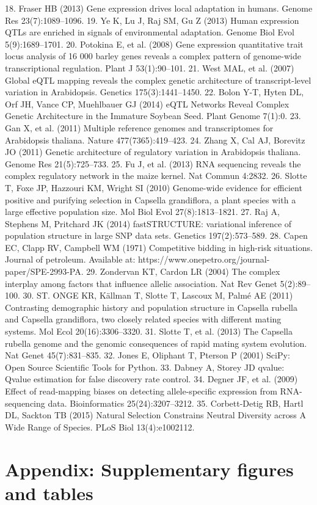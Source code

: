 18. 	Fraser HB (2013) Gene expression drives local adaptation in humans. Genome Res 23(7):1089–1096.
19. 	Ye K, Lu J, Raj SM, Gu Z (2013) Human expression QTLs are enriched in signals of environmental adaptation. Genome Biol Evol 5(9):1689–1701.
20. 	Potokina E, et al. (2008) Gene expression quantitative trait locus analysis of 16 000 barley genes reveals a complex pattern of genome-wide transcriptional regulation. Plant J 53(1):90–101.
21. 	West MAL, et al. (2007) Global eQTL mapping reveals the complex genetic architecture of transcript-level variation in Arabidopsis. Genetics 175(3):1441–1450.
22. 	Bolon Y-T, Hyten DL, Orf JH, Vance CP, Muehlbauer GJ (2014) eQTL Networks Reveal Complex Genetic Architecture in the Immature Soybean Seed. Plant Genome 7(1):0.
23. 	Gan X, et al. (2011) Multiple reference genomes and transcriptomes for Arabidopsis thaliana. Nature 477(7365):419–423.
24. 	Zhang X, Cal AJ, Borevitz JO (2011) Genetic architecture of regulatory variation in Arabidopsis thaliana. Genome Res 21(5):725–733.
25. 	Fu J, et al. (2013) RNA sequencing reveals the complex regulatory network in the maize kernel. Nat Commun 4:2832.
26. 	Slotte T, Foxe JP, Hazzouri KM, Wright SI (2010) Genome-wide evidence for efficient positive and purifying selection in Capsella grandiflora, a plant species with a large effective population size. Mol Biol Evol 27(8):1813–1821.
27. 	Raj A, Stephens M, Pritchard JK (2014) fastSTRUCTURE: variational inference of population structure in large SNP data sets. Genetics 197(2):573–589.
28. 	Capen EC, Clapp RV, Campbell WM (1971) Competitive bidding in high-risk situations. Journal of petroleum. Available at: https://www.onepetro.org/journal-paper/SPE-2993-PA.
29. 	Zondervan KT, Cardon LR (2004) The complex interplay among factors that influence allelic association. Nat Rev Genet 5(2):89–100.
30. 	ST. ONGE KR, Källman T, Slotte T, Lascoux M, Palmé AE (2011) Contrasting demographic history and population structure in Capsella rubella and Capsella grandiflora, two closely related species with different mating systems. Mol Ecol 20(16):3306–3320.
31. 	Slotte T, et al. (2013) The Capsella rubella genome and the genomic consequences of rapid mating system evolution. Nat Genet 45(7):831–835.
32. 	Jones E, Oliphant T, Pterson P (2001) SciPy: Open Source Scientific Tools for Python.
33. 	Dabney A, Storey JD qvalue: Qvalue estimation for false discovery rate control.
34. 	Degner JF, et al. (2009) Effect of read-mapping biases on detecting allele-specific expression from RNA-sequencing data. Bioinformatics 25(24):3207–3212.
35. 	Corbett-Detig RB, Hartl DL, Sackton TB (2015) Natural Selection Constrains Neutral Diversity across A Wide Range of Species. PLoS Biol 13(4):e1002112.

\section{Appendix: Supplementary figures and tables}
